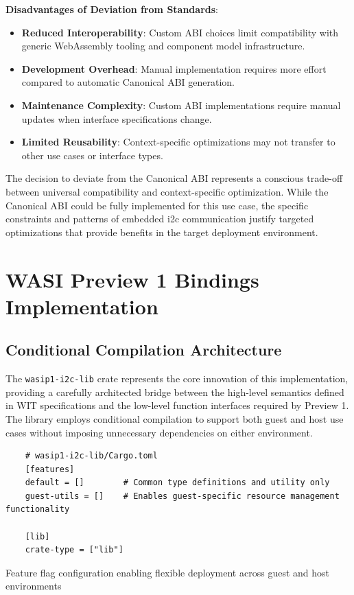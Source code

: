 \textbf{Disadvantages of Deviation from Standards}:
\begin{itemize}
    \item \textbf{Reduced Interoperability}: Custom ABI choices limit compatibility with generic WebAssembly tooling and component model infrastructure.
    \item \textbf{Development Overhead}: Manual implementation requires more effort compared to automatic Canonical ABI generation.
    \item \textbf{Maintenance Complexity}: Custom ABI implementations require manual updates when interface specifications change.
    \item \textbf{Limited Reusability}: Context-specific optimizations may not transfer to other use cases or interface types.
\end{itemize}

The decision to deviate from the Canonical ABI represents a conscious trade-off between universal compatibility and context-specific optimization. While the Canonical ABI could be fully implemented for this use case, the specific constraints and patterns of embedded \acrshort{i2c} communication justify targeted optimizations that provide benefits in the target deployment environment.

\section{WASI Preview 1 Bindings Implementation}
\label{sec:wasip1-bindings}

\subsection{Conditional Compilation Architecture}

The \texttt{wasip1-i2c-lib} crate represents the core innovation of this implementation, providing a carefully architected bridge between the high-level semantics defined in WIT specifications and the low-level function interfaces required by Preview 1. The library employs conditional compilation to support both guest and host use cases without imposing unnecessary dependencies on either environment.

\begin{listing}[H]
    \begin{verbatim}
    # wasip1-i2c-lib/Cargo.toml
    [features]
    default = []        # Common type definitions and utility only
    guest-utils = []    # Enables guest-specific resource management functionality
    
    [lib]
    crate-type = ["lib"]
    \end{verbatim}
    \caption{Feature flag configuration enabling flexible deployment across guest and host environments}
    \label{lst:conditional-compilation}
\end{listing}

